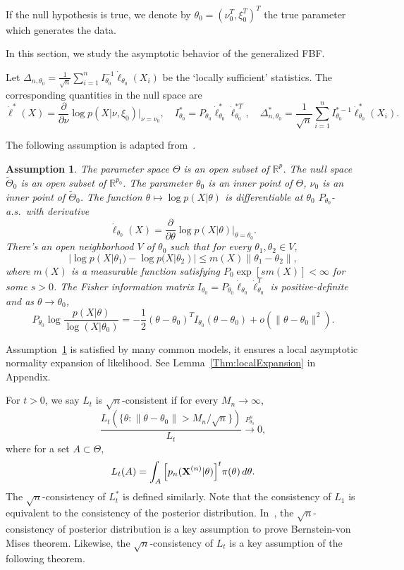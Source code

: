 \documentclass[3p]{elsarticle}
\theoremstyle{plain}
\newtheorem{assumption}{\quad\quad Assumption}
\theoremstyle{definition}
\theoremstyle{remark}
\begin{document}
If the null hypothesis is true, we denote by $\theta_0=(\nu_0^T,\xi_0^T)^T$ the true parameter which generates the data.

In this section, we study the asymptotic behavior of the generalized FBF.

Let $\Delta_{n,\theta_0}=\frac{1}{\sqrt{n}}\sum_{i=1}^n I_{\theta_0}^{-1}\dot{\ell}_{\theta_0}(X_i)$ be the `locally sufficient' statistics.
The corresponding quantities in the null space are 
$$\dot{\ell}^*(X)=\frac{\partial}{\partial \nu}\log p(X|\nu,\xi_0)\Big|_{\nu=\nu_0}, \quad I^*_{\theta_0}=P_{\theta_0}\dot{\ell}_{\theta_0}^*\dot{\ell}_{\theta_0}^{*T},\quad \Delta_{n,\theta_0}^*
=\frac{1}{\sqrt{n}}\sum_{i=1}^n I_{\theta_0}^{*-1}\dot{\ell}^{*}_{\theta_0}(X_i).
$$



The following assumption is adapted from~\cite{Kleijn2012The}.
\begin{assumption}\label{Assumption1}
The parameter space $\Theta$ is an open subset of $\mathbb{R}^p$. 
    The null space $\tilde{\Theta}_0$ is an open subset of $\mathbb{R}^{p_0}$.
    The parameter $\theta_0$ is an inner point of $\Theta$, $\nu_0$ is an inner point of $\tilde{\Theta}_0$.
    The function $\theta \mapsto \log p(X|\theta)$ is differentiable at $\theta_0$  $P_{\theta_0}$-a.s.\ with derivative 
$$\dot{\ell}_{\theta_0}(X)=\frac{\partial}{\partial \theta}\log p(X|\theta)\Big|_{\theta=\theta_0}.$$
There's an open neighborhood $V$ of $\theta_0$ such that for every $\theta_1,\theta_2\in V$,
        \begin{equation*}
            |\log p(X|\theta_1)-\log p(X|\theta_2)|\leq m(X)\|\theta_1-\theta_2\|,
        \end{equation*}
        where $m(X)$ is a measurable function satisfying $P_{0}\exp[s m(X)]<\infty$ for some $s>0$.
        The Fisher information matrix $I_{\theta_0}=P_{\theta_0}\dot{\ell}_{\theta_0}\dot{\ell}_{\theta_0}^T$ is positive-definite and as $\theta\to \theta_0$,
    \begin{equation*}
        P_{\theta_0} \log \frac{p(X|\theta)}{ \log (X|\theta_0)}
        =-\frac{1}{2}(\theta-\theta_0)^T I_{\theta_0} (\theta-\theta_0)+o(\|\theta-\theta_0\|^2).
    \end{equation*}
\end{assumption}     
Assumption~\ref{Assumption1} is satisfied by many common models, it ensures a local asymptotic normality expansion of likelihood. See Lemma~\ref{Thm:localExpansion} in Appendix.

    For $t>0$, we say $L_t$ is $\sqrt{n}$-consistent if for every $M_n\to \infty$,
    $$
    \frac{L_t({\{\theta:\|\theta-\theta_0\|> M_n/\sqrt{n}\}})}{L_t}\xrightarrow{P_{\theta_0}^n} 0,
    $$
    where for a set $A\subset \Theta$,
$$
L_t (A)=\int_{A} \Big[ {p_n(\mathbf{X}^{(n)}|\theta)} \Big]^{t} \pi(\theta) \, d \theta.
$$
The $\sqrt{n}$-consistency of $L_t^*$ is defined similarly.
    Note that the consistency of $L_1$ is equivalent to the consistency of the posterior distribution.
    In~\cite{Kleijn2012The}, the $\sqrt{n}$-consistency of posterior distribution is a key assumption to prove Bernstein-von Mises theorem.
    Likewise, the $\sqrt{n}$-consistency of $L_t$ is a key assumption of the following theorem.
\end{document}
